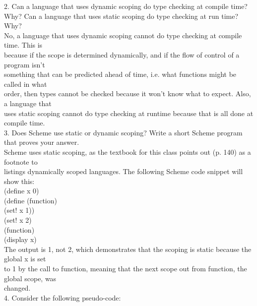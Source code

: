 \documentclass[12pt]{article}
\begin{document}
\begin{flushleft}
2.  Can a language that uses dynamic scoping do type checking at compile time? Why?  Can a language that uses static scoping do type checking at run time? Why?\\
[2mm]

\qquad No, a language that uses dynamic scoping cannot do type checking at compile time.  This is\\
\qquad because if the scope is determined dynamically, and if the flow of control of a program isn't\\
\qquad something that can be predicted ahead of time, i.e. what functions might be called in what\\
\qquad order, then types cannot be checked because it won't know what to expect.  Also, a language that\\
\qquad uses static scoping cannot do type checking at runtime because that is all done at compile time.\\
[2mm]
 

3.  Does Scheme use static or dynamic scoping? Write a short Scheme program that
proves your answer.\\
[2mm]
\qquad Scheme uses static scoping, as the textbook for this class points out (p. 140) as a footnote to\\
\qquad listings dynamically scoped languages.  The following Scheme code snippet will show this:\\
[2mm]

\qquad (define x 0)\\

\qquad (define (function)\\
\qquad \qquad \qquad (set! x 1))\\
[2mm]
\qquad (set! x 2)\\
\qquad (function)\\
\qquad (display x)\\
[2mm]

\qquad The output is 1, not 2, which demonstrates that the scoping is static because the global x is set\\
\qquad to 1 by the call to function, meaning that the next scope out from function, the global scope, was\\
\qquad changed.\\
[2mm]

4.  Consider the following pseudo-code:\\
[2mm]


\end{flushleft}
\end{document}
